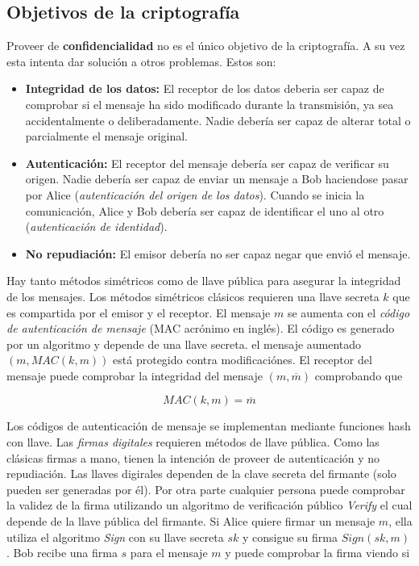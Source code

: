 \documentclass[12pt]{article}
\theoremstyle{definition}
\begin{document}
\subsection{Objetivos de la criptografía}

Proveer de \textbf{confidencialidad} no es el único objetivo de la criptografía. A su vez esta intenta dar solución a otros problemas. Estos son:

\begin{itemize}
\item \textbf{Integridad de los datos:} El receptor de los datos deberia ser capaz de comprobar si el mensaje ha sido modificado durante la transmisión, ya sea accidentalmente o deliberadamente. Nadie debería ser capaz de alterar total o parcialmente el mensaje original.

\item \textbf{Autenticación:} El receptor del mensaje debería ser capaz de verificar su origen. Nadie debería ser capaz de enviar un mensaje a Bob haciendose pasar por Alice (\textit{autenticación del origen de los datos}). Cuando se inicia la comunicación, Alice y Bob debería ser capaz de identificar el uno al otro (\textit{autenticación de identidad}).

\item \textbf{No repudiación:} El emisor debería no ser capaz negar que envió el mensaje.
\end{itemize}

Hay tanto métodos simétricos como de llave pública para asegurar la integridad de los mensajes. Los métodos simétricos clásicos requieren una llave secreta $k$ que es compartida por el emisor y el receptor. El mensaje $m$ se aumenta con el \textit{código de autenticación de mensaje} (MAC acrónimo en inglés). El código es generado por un algoritmo y depende de una llave secreta. el mensaje aumentado $(m,MAC(k,m))$ está protegido contra modificaciónes. El receptor del mensaje puede comprobar la integridad del mensaje $(m,\overline{m})$ comprobando que

$$MAC(k,m)=\overline{m}$$

Los códigos de autenticación de mensaje se implementan mediante funciones hash con llave.
\newline
\newline
Las \textit{firmas digitales} requieren métodos de llave pública. Como las clásicas firmas a mano, tienen la intención de proveer de autenticación y no repudiación. Las llaves digirales dependen de la clave secreta del firmante (solo pueden ser generadas por él). Por otra parte cualquier persona puede comprobar la validez de la firma utilizando un algoritmo de verificación público \textit{Verify} el cual depende de la llave pública del firmante. Si Alice quiere firmar un mensaje $m$, ella utiliza el algoritmo \textit{Sign} con su llave secreta $sk$ y consigue su firma $Sign(sk,m)$. Bob recibe una firma $s$ para el mensaje $m$ y puede comprobar la firma viendo si
\end{document}
